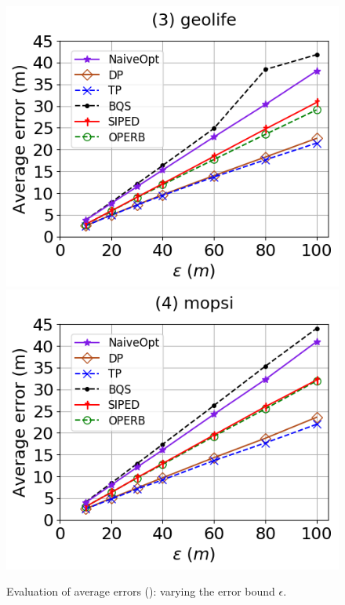 \begin{figure}[tb!]
	\includegraphics[scale=0.315]{Figures/Exp-PED-error-epsilon-geolife.png}	\hspace{1ex}
	\includegraphics[scale=0.315]{Figures/Exp-PED-error-epsilon-mopsi.png}	
	\vspace{-3ex}
	\caption{\small Evaluation of average errors (\ped): varying the error bound $\epsilon$.}
	\label{fig:ae-ped-epsilon}
	\vspace{-2ex}
\end{figure}

